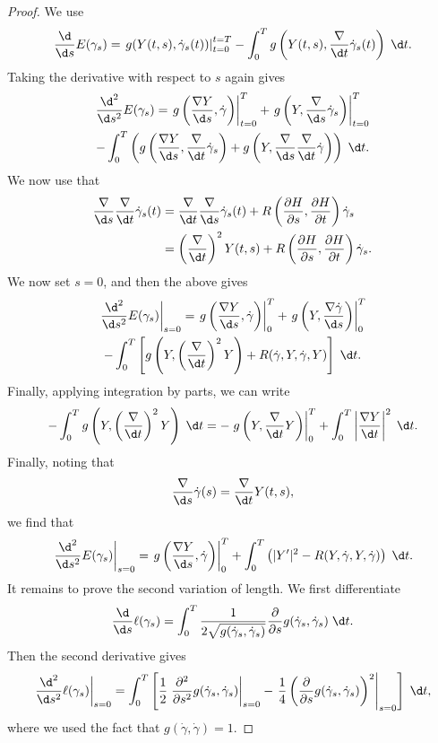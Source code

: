 \documentclass[a4paper]{article}
\begin{document}
\begin{proof}
  We use
  \[
    \frac{\d}{\d s}E(\gamma_s) = \left.g(Y(t, s), \dot{\gamma}_s(t))\right|_{t = 0}^{t = T} - \int_0^T g\left(Y(t, s), \frac{\nabla}{\d t} \dot{\gamma}_s(t)\right)\;\d t.
  \]
  Taking the derivative with respect to $s$ again gives
  \begin{multline*}
    \frac{\d^2}{\d s^2}E(\gamma_s) =\left. g\left(\frac{\nabla Y}{\d s}, \dot{\gamma}\right)\right|_{t = 0}^T + \left.g\left(Y, \frac{\nabla}{\d s} \dot{\gamma}_s\right)\right|_{t = 0}^{T} \\
    - \int_0^T \left(g\left(\frac{\nabla Y}{\d s}, \frac{\nabla}{\d t} \dot{\gamma}_s\right) + g\left(Y, \frac{\nabla}{\d s} \frac{\nabla}{\d t} \dot{\gamma}\right)\right)\;\d t.
  \end{multline*}
  We now use that
  \begin{align*}
    \frac{\nabla}{\d s} \frac{\nabla}{\d t} \dot\gamma_s(t) &= \frac{\nabla}{\d t} \frac{\nabla}{\d s} \dot{\gamma}_s(t) + R\left(\frac{\partial H}{\partial s}, \frac{\partial H}{\partial t}\right)\dot{\gamma}_s\\
    &= \left(\frac{\nabla}{\d t}\right)^2 Y(t, s) + R\left(\frac{\partial H}{\partial s}, \frac{\partial H}{\partial t}\right)\dot{\gamma}_s.
  \end{align*}
  We now set $s = 0$, and then the above gives
  \begin{multline*}
    \left.\frac{\d^2}{\d s^2} E(\gamma_s)\right|_{s = 0} = \left.g\left(\frac{\nabla Y}{\d s}, \dot{\gamma}\right)\right|_0^T + \left.g\left(Y, \frac{\nabla \dot{\gamma}}{\d s}\right)\right|_0^T \\
    - \int_0^T \left[g\left(Y, \left(\frac{\nabla}{\d t}\right)^2 Y\right) + R(\dot{\gamma}, Y, \dot{\gamma}, Y)\right]\;\d t.
  \end{multline*}
  Finally, applying integration by parts, we can write
  \[
    -\int_0^T g\left(Y, \left(\frac{\nabla}{\d t}\right)^2 Y\right) \;\d t= - \left.g\left(Y, \frac{\nabla}{\d t}Y\right)\right|_0^T + \int_0^T \left|\frac{\nabla Y}{\d t}\right|^2\;\d t.
  \]
  Finally, noting that
  \[
    \frac{\nabla}{\d s} \dot{\gamma}(s) = \frac{\nabla}{\d t} Y(t, s),
  \]
  we find that
  \[
    \left.\frac{\d^2}{\d s^2} E(\gamma_s)\right|_{s = 0} = \left.g\left(\frac{\nabla Y}{\d s}, \dot{\gamma}\right)\right|_0^T + \int_0^T \left(|Y'|^2 - R(Y, \dot{\gamma}, Y, \dot{\gamma})\right)\;\d t.
  \]
  It remains to prove the second variation of length. We first differentiate
  \[
    \frac{\d}{\d s}\ell(\gamma_s) = \int_0^T \frac{1}{2 \sqrt{g(\dot{\gamma}_s, \dot{\gamma}_s)}} \frac{\partial}{\partial s} g(\dot{\gamma}_s, \dot{\gamma}_s)\;\d t.
  \]
  Then the second derivative gives
  \[
    \left.\frac{\d^2}{\d s^2} \ell(\gamma_s) \right|_{s = 0} = \int_0^T \left[\frac{1}{2} \left.\frac{\partial^2}{\partial s^2} g(\dot{\gamma}_s, \dot{\gamma}_s) \right|_{s = 0} - \left.\frac{1}{4} \left(\frac{\partial}{\partial s} g(\dot{\gamma}_s, \dot{\gamma}_s)\right)^2\right|_{s = 0}\right]\;\d t,
  \]
  where we used the fact that $g(\dot{\gamma}, \dot{\gamma}) = 1$.


\end{proof}
\end{document}
